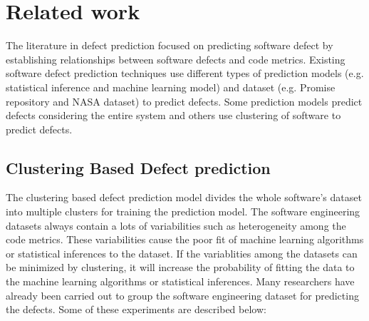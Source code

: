 \documentclass[12pt]{report}
\begin{document}
\section{Related work}

The literature in defect prediction focused on predicting software defect by establishing relationships between software defects and code metrics. Existing software defect prediction techniques use different types of prediction models (e.g. statistical inference and machine learning model) and dataset (e.g. Promise repository and NASA dataset) to predict defects. Some prediction models predict defects considering the entire system and others use clustering of software to predict defects. 
 
\subsection{Clustering Based Defect prediction}
The clustering based defect prediction model divides the whole software's dataset into multiple clusters for training the prediction model. The software engineering datasets always contain a lots of variabilities such as heterogeneity among the code metrics. These variabilities cause the poor fit of machine learning algorithms or statistical inferences to the dataset. If the variablities among the datasets can be minimized by clustering, it will increase the probability of fitting the data to the machine learning algorithms or statistical inferences.  Many researchers have already been carried out to group the software engineering dataset for predicting the defects. Some of these experiments are described below:
\end{document}
